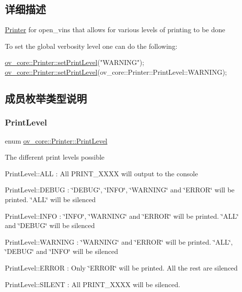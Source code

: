 \subsection{详细描述}
\hyperlink{classov__core_1_1Printer}{Printer} for open\+\_\+vins that allows for various levels of printing to be done 

To set the global verbosity level one can do the following\+: 
\begin{DoxyCode}
\hyperlink{classov__core_1_1Printer_a46c933308a512618c304afefee62ead8}{ov\_core::Printer::setPrintLevel}(\textcolor{stringliteral}{"WARNING"});
\hyperlink{classov__core_1_1Printer_a46c933308a512618c304afefee62ead8}{ov\_core::Printer::setPrintLevel}(ov\_core::Printer::PrintLevel::WARNING);
\end{DoxyCode}
 

\subsection{成员枚举类型说明}
\mbox{\label{classov__core_1_1Printer_a1c4c6c612ec6251afd91a1ddf933a0b2}} 
\subsubsection{\texorpdfstring{Print\+Level}{PrintLevel}}
{\footnotesize\ttfamily enum \hyperlink{classov__core_1_1Printer_a1c4c6c612ec6251afd91a1ddf933a0b2}{ov\+\_\+core\+::\+Printer\+::\+Print\+Level}}



The different print levels possible 


\begin{DoxyItemize}
\item Print\+Level\+::\+A\+LL \+: All P\+R\+I\+N\+T\+\_\+\+X\+X\+XX will output to the console
\item Print\+Level\+::\+D\+E\+B\+UG \+: \char`\"{}\+D\+E\+B\+U\+G\char`\"{}, \char`\"{}\+I\+N\+F\+O\char`\"{}, \char`\"{}\+W\+A\+R\+N\+I\+N\+G\char`\"{} and \char`\"{}\+E\+R\+R\+O\+R\char`\"{} will be printed. \char`\"{}\+A\+L\+L\char`\"{} will be silenced
\item Print\+Level\+::\+I\+N\+FO \+: \char`\"{}\+I\+N\+F\+O\char`\"{}, \char`\"{}\+W\+A\+R\+N\+I\+N\+G\char`\"{} and \char`\"{}\+E\+R\+R\+O\+R\char`\"{} will be printed. \char`\"{}\+A\+L\+L\char`\"{} and \char`\"{}\+D\+E\+B\+U\+G\char`\"{} will be silenced
\item Print\+Level\+::\+W\+A\+R\+N\+I\+NG \+: \char`\"{}\+W\+A\+R\+N\+I\+N\+G\char`\"{} and \char`\"{}\+E\+R\+R\+O\+R\char`\"{} will be printed. \char`\"{}\+A\+L\+L\char`\"{}, \char`\"{}\+D\+E\+B\+U\+G\char`\"{} and \char`\"{}\+I\+N\+F\+O\char`\"{} will be silenced
\item Print\+Level\+::\+E\+R\+R\+OR \+: Only \char`\"{}\+E\+R\+R\+O\+R\char`\"{} will be printed. All the rest are silenced
\item Print\+Level\+::\+S\+I\+L\+E\+NT \+: All P\+R\+I\+N\+T\+\_\+\+X\+X\+XX will be silenced. 
\end{DoxyItemize}

